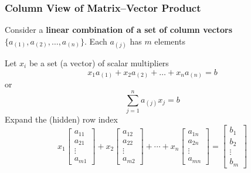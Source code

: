 \documentclass[10pt]{beamer}
\begin{document}
\begin{frame}
\frametitle{Column View of Matrix--Vector Product}

Consider a \textbf{linear combination of a set of column vectors}
$\{a_{(1)}, a_{(2)}, \ldots, a_{(n)}\}$.  Each $a_{(j)}$ has $m$ elements

Let $x_i$ be a set (a vector) of scalar multipliers
\begin{equation*}
    x_1 a_{(1)} + x_2 a_{(2)} +  \ldots + x_n a_{(n)} = b
\end{equation*}
or
\begin{equation*}
    \sum_{j=1}^n a_{(j)}x_j = b
\end{equation*}
Expand the (hidden) row index
\begin{equation*}
      x_1 \begin{bmatrix} a_{11} \\ a_{21} \\ \vdots \\ a_{m1} \end{bmatrix}
    + x_2 \begin{bmatrix} a_{12} \\ a_{22} \\ \vdots \\ a_{m2} \end{bmatrix}
    + \cdots
    + x_n \begin{bmatrix} a_{1n} \\ a_{2n} \\ \vdots \\ a_{mn} \end{bmatrix}
    = \begin{bmatrix} b_1 \\ b_2 \\ \vdots \\ b_m \end{bmatrix}
\end{equation*}

\end{frame}
\end{document}
